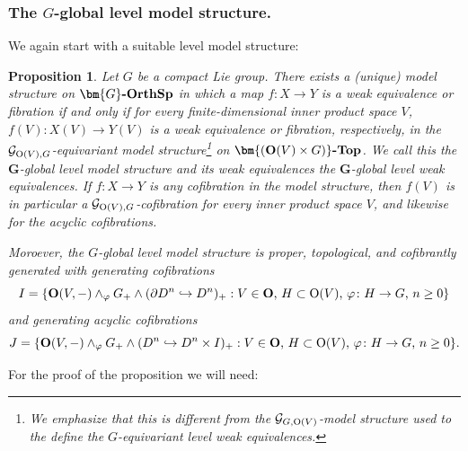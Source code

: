 \documentclass[reqno]{memo-l}
\theoremstyle{mythm}
\newtheorem{prop}[thm]{Proposition}
\theoremstyle{definition}
\numberwithin{equation}{section}
\renewcommand{\phi}{\varphi}
\newcommand{\cat}[1]{\textbf{\textup{#1}}}
\renewcommand{\O}{{\textup{O}}}
\let\smashp=\wedge
\newcommand{\Gosp}[1]{\cat{$\bm{#1}$-OrthSp}}
\begin{document}
\medskip
\subsubsection{The $G$-global level model structure.} We again start with a suitable level model structure:

\begin{prop}\label{prop:global-lvl-GSp}
    Let $G$ be a compact Lie group. There exists a (unique) model structure on $\Gosp{G}$ in which a map $f\colon X\to Y$ is a weak equivalence or fibration if and only if for every finite-dimensional inner product space $V$, $f(V)\colon X(V)\to Y(V)$ is a weak equivalence or fibration, respectively, in the $\mathcal G_{\O(V),G}$-equivariant model structure\footnote{We emphasize that this is different from the $\mathcal G_{G,\O(V)}$-model structure used to the define the \emph{$G$-equivariant} level weak equivalences.} on $\cat{$\bm{(\O(V)\times G)}$-Top}$. We call this the \emph{$\bm G$-global level model structure} and its weak equivalences the \emph{$\bm G$-global level weak equivalences}. If $f\colon X\to Y$ is any cofibration in the model structure, then $f(V)$ is in particular a $\mathcal G_{\O(V),G}$-cofibration for every inner product space $V$, and likewise for the acyclic cofibrations.
    
    Moroever, the $G$-global level model structure is proper, topological, and cofibrantly generated with generating cofibrations
    \[
        I=\{\cat{O}(V,-)\smashp_\phi G_+\smashp(\partial D^n\hookrightarrow D^n)_+ : \text{$V\in\cat{O}$, $H\subset \O(V)$, $\phi\colon H\to G$, $n\ge0$}\}
    \]
    and generating acyclic cofibrations
    \[
        J=\{\cat{O}(V,-)\smashp_\phi G_+\smashp(D^n\hookrightarrow D^n\times I)_+ : \text{$V\in\cat{O}$, $H\subset \O(V)$, $\phi\colon H\to G$, $n\ge0$}\}.
    \]
\end{prop}

For the proof of the proposition we will need:
\end{document}
